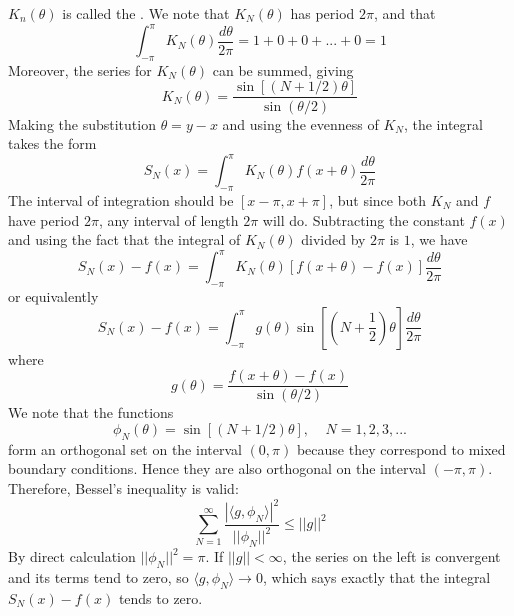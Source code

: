 \documentclass[12pt, a4paper, oneside, openright, titlepage]{book}
\begin{document}
$K_n(\theta)$ is called the . We note that $K_N(\theta)$ has period $2\pi$, and that \begin{equation*}
    \int_{-\pi}^{\pi}K_N(\theta)\frac{d\theta}{2\pi} = 1+0+0+...+0 = 1
\end{equation*}
Moreover, the series for $K_N(\theta)$ can be summed, giving \begin{equation*}
    K_N(\theta) = \frac{\sin[(N+1/2)\theta]}{\sin(\theta/2)}
\end{equation*}
Making the substitution $\theta = y-x$ and using the evenness of $K_N$, the integral takes the form \begin{equation*}
    S_N(x) = \int_{-\pi}^{\pi}K_N(\theta)f(x+\theta)\frac{d\theta}{2\pi}
\end{equation*}
The interval of integration should be $[x-\pi,x+\pi]$, but since both $K_N$ and $f$ have period $2\pi$, any interval of length $2\pi$ will do. Subtracting the constant $f(x)$ and using the fact that the integral of $K_N(\theta)$ divided by $2\pi$ is $1$, we have \begin{equation*}
    S_N(x) - f(x) = \int_{-\pi}^{\pi}K_N(\theta)[f(x+\theta)-f(x)]\frac{d\theta}{2\pi}
\end{equation*}
or equivalently \begin{equation*}
    S_N(x) - f(x) = \int_{-\pi}^{\pi}g(\theta)\sin\left[\left(N+\frac{1}{2}\right)\theta\right]\frac{d\theta}{2\pi}
\end{equation*}
where \begin{equation*}
    g(\theta) = \frac{f(x+\theta)-f(x)}{\sin(\theta/2)}
\end{equation*}
We note that the functions \begin{equation*}
    \phi_N(\theta) = \sin[(N+1/2)\theta],\;\;\;\;N=1,2,3,...
\end{equation*}
form an orthogonal set on the interval $(0,\pi)$ because they correspond to mixed boundary conditions. Hence they are also orthogonal on the interval $(-\pi,\pi)$. Therefore, Bessel's inequality is valid: \begin{equation*}
    \sum_{N=1}^{\infty}\frac{|\langle g,\phi_N\rangle|^2}{||\phi_N||^2} \leq ||g||^2
\end{equation*}
By direct calculation $||\phi_N||^2 = \pi$. If $||g|| < \infty$, the series on the left is convergent and its terms tend to zero, so $\langle g,\phi_N\rangle \rightarrow 0$, which says exactly that the integral $S_N(x) - f(x)$ tends to zero.
\end{document}
